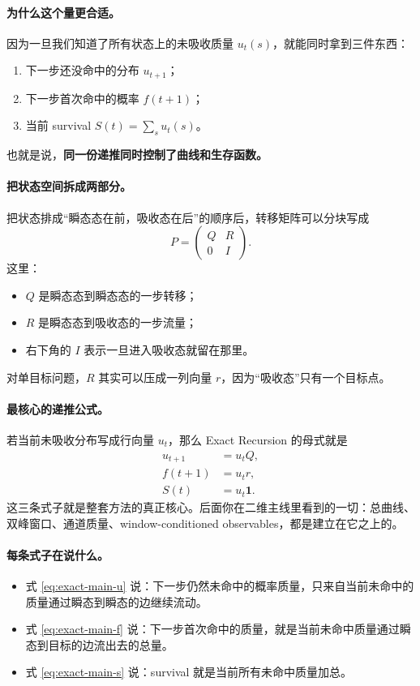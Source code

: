 \documentclass[11pt,fontset=fandol]{ctexart}
\begin{document}
\paragraph{为什么这个量更合适。}
因为一旦我们知道了所有状态上的未吸收质量 $u_t(s)$，就能同时拿到三件东西：
\begin{enumerate}
  \item 下一步还没命中的分布 $u_{t+1}$；
  \item 下一步首次命中的概率 $f(t+1)$；
  \item 当前 survival $S(t)=\sum_s u_t(s)$。
\end{enumerate}
也就是说，\textbf{同一份递推同时控制了曲线和生存函数。}

\paragraph{把状态空间拆成两部分。}
把状态排成“瞬态态在前，吸收态在后”的顺序后，转移矩阵可以分块写成
\begin{equation}
  P=
  \begin{pmatrix}
    Q & R \\
    0 & I
  \end{pmatrix}.
  \label{eq:block-matrix}
\end{equation}
这里：
\begin{itemize}
  \item $Q$ 是瞬态态到瞬态态的一步转移；
  \item $R$ 是瞬态态到吸收态的一步流量；
  \item 右下角的 $I$ 表示一旦进入吸收态就留在那里。
\end{itemize}
对单目标问题，$R$ 其实可以压成一列向量 $r$，因为“吸收态”只有一个目标点。

\paragraph{最核心的递推公式。}
若当前未吸收分布写成行向量 $u_t$，那么 Exact Recursion 的母式就是
\begin{align}
  u_{t+1} &= u_t Q, \label{eq:exact-main-u}\\
  f(t+1) &= u_t r, \label{eq:exact-main-f}\\
  S(t) &= u_t\mathbf 1. \label{eq:exact-main-s}
\end{align}
这三条式子就是整套方法的真正核心。后面你在二维主线里看到的一切：总曲线、双峰窗口、通道质量、window-conditioned observables，都是建立在它之上的。

\paragraph{每条式子在说什么。}
\begin{itemize}
  \item 式 \eqref{eq:exact-main-u} 说：下一步仍然未命中的概率质量，只来自当前未命中的质量通过瞬态到瞬态的边继续流动。
  \item 式 \eqref{eq:exact-main-f} 说：下一步首次命中的质量，就是当前未命中质量通过瞬态到目标的边流出去的总量。
  \item 式 \eqref{eq:exact-main-s} 说：survival 就是当前所有未命中质量加总。
\end{itemize}
\end{document}
